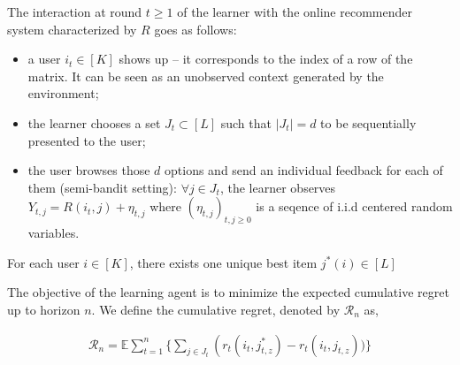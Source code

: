 

The interaction at round $t\geq 1$ of the learner with the online recommender system characterized by $R$
goes as follows:
\begin{itemize}
	\item a user $i_t\in [K]$ shows up -- it corresponds to the index of a row of the matrix. It can be seen as an unobserved context generated by the environment;
	\item the learner chooses a set $J_t\subset [L]$ such that $|J_t|=d$ to be sequentially presented to the user;
	\item the user browses those $d$ options and send an individual feedback for each of them (semi-bandit setting): $\forall j\in J_t$, the learner observes $Y_{t,j}= R(i_t,j) + \eta_{t,j}$ where $(\eta_{t,j})_{t,j\geq 0}$ is a seqence of i.i.d centered random variables. 
\end{itemize}

For each user $i\in [K]$, there exists one unique best item $j^*(i)\in [L]$

The objective of the learning agent is to minimize the expected cumulative regret up to horizon $n$. We define the cumulative regret, denoted by $\mathcal{R}_n$ as,

\begin{align*}
\mathcal{R}_n = \mathds{E}\sum_{t=1}^{n}\bigg\lbrace \sum_{j\in J_t} \left( r_{t}\left(i_{t}, j^*_{t,z} \right) - r_{t}\left( i_{t}, j_{t,z}\right)\bigg)\bigg\rbrace
\end{align*}


